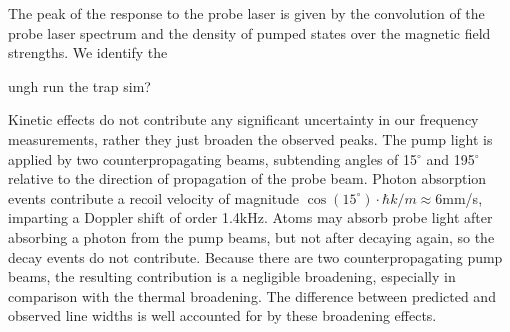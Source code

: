 	The peak of the response to the probe laser is given by the convolution of the probe laser spectrum and the density of pumped states over the magnetic field strengths.
	We identify the 

	ungh run the trap sim?

Kinetic effects do not contribute any significant uncertainty in our frequency measurements, rather they just broaden the observed peaks.
	The pump light is applied by two counterpropagating beams, subtending angles of 15$^\circ$ and 195$^\circ$ relative to the direction of propagation of the probe beam.
	Photon absorption events contribute a recoil velocity of magnitude $\cos(15^\circ)\cdot\hbar k/m\approx6$mm/s, imparting a Doppler shift of order 1.4kHz.
	Atoms may absorb probe light after absorbing a photon from the pump beams, but not after decaying again, so the decay events do not contribute.
	Because there are two counterpropagating pump beams, the resulting contribution is a negligible broadening, especially in comparison with the thermal broadening.
	The difference between predicted and observed line widths is well accounted for by these broadening effects.


